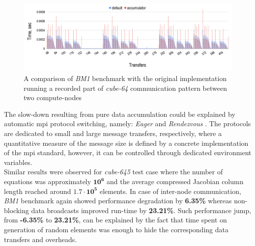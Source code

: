 \begin{figure}[htpb]
  \centering
  \includegraphics[width=1.0\textwidth]{figures/chapter-3/benchmark-result-non-blocking-inter-node-comm.png}
  \caption{A comparison of \textit{BM1} benchmark with the original implementation running a recorded part of \textit{cube-64} communication pattern between two compute-nodes}
\label{fig:benchmark:results-cube-64-inter-node-comm}
\end{figure}


The slow-down resulting from pure data accumulation could be explained by automatic \acrshort{mpi} protocol switching, namely: \textit{Eager} and \textit{Rendezvous} \cite{mpi:protocols-explanation}. The protocols are dedicated to small and large message transfers, respectively, where a quantitative measure of the message size is defined by a concrete implementation of the \acrshort{mpi} standard, however, it can be controlled through dedicated environment variables.\\



Similar results were observed for \textit{cube-645} test case where the number of equations was approximately $\bm{10^6}$ and the average compressed Jacobian column length reached around $\bm{1.7 \cdot 10^5}$ elements. In case of  inter-node communication, \textit{BM1} benchmark again showed performance degradation by \textbf{6.35\%} whereas non-blocking data broadcasts improved run-time by \textbf{23.21\%}. Such performance jump, from \textbf{-6.35\%} to \textbf{23.21\%}, can be explained by the fact that time spent on generation of random elements was enough to hide the corresponding data transfers and overheads.\\



